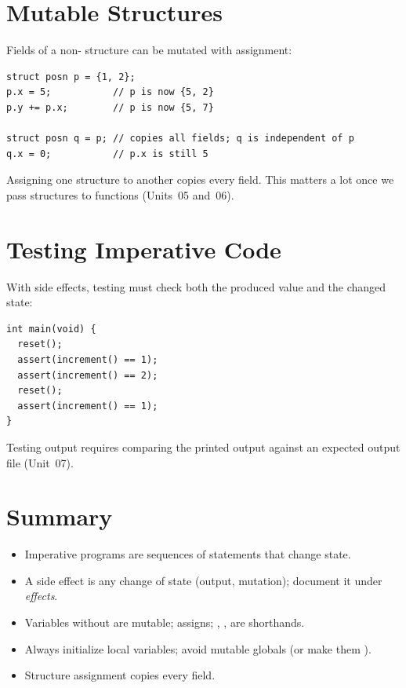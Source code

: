 \section{Mutable Structures}

Fields of a non- structure can be mutated with assignment:
\begin{lstlisting}[style=c]
struct posn p = {1, 2};
p.x = 5;           // p is now {5, 2}
p.y += p.x;        // p is now {5, 7}

struct posn q = p; // copies all fields; q is independent of p
q.x = 0;           // p.x is still 5
\end{lstlisting}
Assigning one structure to another copies every field. This matters a lot once we pass
structures to functions (Units~05 and~06).

\section{Testing Imperative Code}

With side effects, testing must check both the produced value and the changed state:
\begin{lstlisting}[style=c]
int main(void) {
  reset();
  assert(increment() == 1);
  assert(increment() == 2);
  reset();
  assert(increment() == 1);
}
\end{lstlisting}
Testing output requires comparing the printed output against an expected output file
(Unit~07).

\section{Summary}
\begin{itemize}
  \item Imperative programs are sequences of statements that change state.
  \item A side effect is any change of state (output, mutation); document it under
    \emph{effects}.
  \item Variables without  are mutable; \code{=} assigns; \code{+=}, ,
     are shorthands.
  \item Always initialize local variables; avoid mutable globals (or make them ).
  \item Structure assignment copies every field.
\end{itemize}
